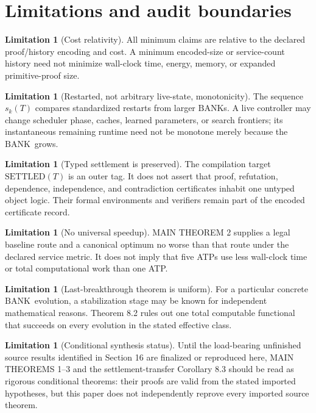 \documentclass[11pt]{article}
\theoremstyle{definition}
\newtheorem{limitation}[theorem]{Limitation}
\newcommand{\BANK}{\ensuremath{\mathrm{BANK}}}
\newcommand{\SETTLED}{\ensuremath{\mathrm{SETTLED}}}
\begin{document}
\section{Limitations and audit boundaries}
\begin{limitation}[Cost relativity]
All minimum claims are relative to the declared proof/history encoding and cost. A minimum encoded-size or service-count history need not minimize wall-clock time, energy, memory, or expanded primitive-proof size.
\end{limitation}

\begin{limitation}[Restarted, not arbitrary live-state, monotonicity]
The sequence $s_k(T)$ compares standardized restarts from larger \BANK s. A live controller may change scheduler phase, caches, learned parameters, or search frontiers; its instantaneous remaining runtime need not be monotone merely because the \BANK\ grows.
\end{limitation}

\begin{limitation}[Typed settlement is preserved]
The compilation target $\SETTLED(T)$ is an outer tag. It does not assert that proof, refutation, dependence, independence, and contradiction certificates inhabit one untyped object logic. Their formal environments and verifiers remain part of the encoded certificate record.
\end{limitation}

\begin{limitation}[No universal speedup]
MAIN THEOREM 2 supplies a legal baseline route and a canonical optimum no worse than that route under the declared service metric. It does not imply that five ATPs use less wall-clock time or total computational work than one ATP.
\end{limitation}

\begin{limitation}[Last-breakthrough theorem is uniform]
For a particular concrete \BANK\ evolution, a stabilization stage may be known for independent mathematical reasons. Theorem 8.2 rules out one total computable functional that succeeds on every evolution in the stated effective class.
\end{limitation}

\begin{limitation}[Conditional synthesis status]
Until the load-bearing unfinished source results identified in Section 16 are finalized or reproduced here, MAIN THEOREMS 1--3 and the settlement-transfer Corollary 8.3 should be read as rigorous conditional theorems: their proofs are valid from the stated imported hypotheses, but this paper does not independently reprove every imported source theorem.
\end{limitation}
\end{document}
